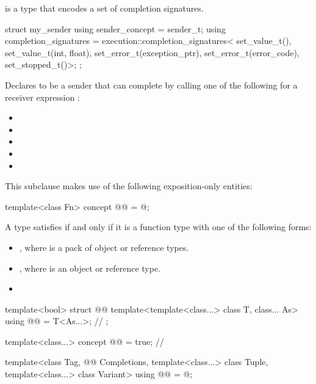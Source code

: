 \pnum
{} is a type
that encodes a set of completion signatures.

\pnum
\begin{example}
\begin{codeblock}
struct my_sender {
  using sender_concept = sender_t;
  using completion_signatures =
    execution::completion_signatures<
      set_value_t(),
      set_value_t(int, float),
      set_error_t(exception_ptr),
      set_error_t(error_code),
      set_stopped_t()>;
};
\end{codeblock}
Declares  to be a sender
that can complete by calling one of the following
for a receiver expression :
\begin{itemize}
\item {}
\item {}
\item {}
\item {}
\item {}
\end{itemize}
\end{example}

\pnum
This subclause makes use of the following exposition-only entities:
\begin{codeblock}
template<class Fn>
  concept @@ = @\seebelow@;
\end{codeblock}

\pnum
A type  satisfies 
if and only if it is a function type with one of the following forms:
\begin{itemize}
\item
{},
where  is a pack of object or reference types.
\item
{},
where  is an object or reference type.
\item
{}
\end{itemize}

\pnum
\begin{codeblock}
template<bool>
  struct @@ {
    template<template<class...> class T, class... As>
      using @@ = T<As...>;                              // \expos
  };

template<class...>
  concept @@ = true;                                   // \expos

template<class Tag,
         @@ Completions,
         template<class...> class Tuple,
         template<class...> class Variant>
  using @@ = @\seebelow@;
\end{codeblock}


